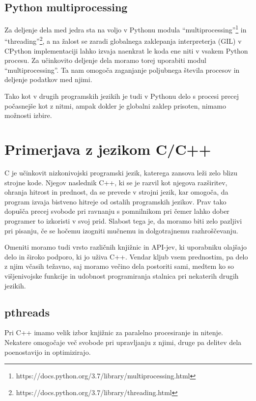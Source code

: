 \documentclass[journal,a4paper,twoside]{sty/IEEEtran}
\begin{document}
\subsection{Python multiprocessing}

Za deljenje dela med jedra sta na voljo v Pythonu modula “multiprocessing”\footnote{https://docs.python.org/3.7/library/multiprocessing.html} in
	“threading”\footnote{https://docs.python.org/3.7/library/threading.html}, a na žalost se zaradi globalnega zaklepanja interpreterja
	(GIL)\cite{python-gil} v CPython implementaciji lahko izvaja naenkrat le koda ene niti v vsakem Python procesu.
Za učinkovito deljenje dela moramo torej uporabiti modul “multiprocessing”.
Ta nam omogoča zaganjanje poljubnega števila procesov in deljenje podatkov med njimi.

Tako kot v drugih programskih jezikih je tudi v Pythonu delo s procesi precej počasnejše kot z nitmi, ampak dokler je globalni zaklep prisoten, nimamo
	možnosti izbire.

\section{Primerjava z jezikom C/C++}

C je učinkovit nizkonivojski programski jezik, katerega zansova leži zelo blizu strojne kode. 
Njegov naslednik C++, ki se je razvil kot njegova razširitev, ohranja hitrost in prednost, da se prevede v strojni jezik, kar omogoča, da program izvaja
	bistveno hitreje od ostalih programskih jezikov.
Prav tako dopušča precej svobode pri ravnanju s pomnilnikom pri čemer lahko dober programer to izkoristi v svoj prid.
Slabost tega je, da moramo biti zelo pazljivi pri pisanju, če se hočemu izogniti mučnemu in dolgotrajnemu razhroščevanju. 

Omeniti moramo tudi vrsto različnih knjižnic in API-jev, ki uporabniku olajšajo delo in široko podporo, ki jo uživa C++.
Vendar kljub vsem prednostim, pa delo z njim včasih težavno, saj moramo večino dela postoriti sami, medtem ko so višjenivojske funkcije in udobnost
	programiranja stalnica pri nekaterih drugih jezikih. 

\subsection{pthreads}

Pri C++ imamo velik izbor knjižnic za paralelno procesiranje in nitenje.
Nekatere omogočaje več svobode pri upravljanju z njimi, druge pa delitev dela poenostavijo in optimizirajo. 
\end{document}
